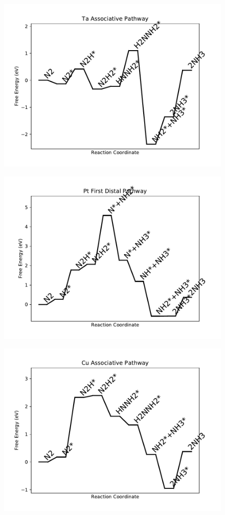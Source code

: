\begin{figure}
\centering
\includegraphics[width=0.8\linewidth]{data/plots/Ta_associative.pdf}
\end{figure}

\begin{figure}
\centering
\includegraphics[width=0.8\linewidth]{data/plots/Pt_distal_1.pdf}
\end{figure}

\begin{figure}
\centering
\includegraphics[width=0.8\linewidth]{data/plots/Cu_associative.pdf}
\end{figure}

